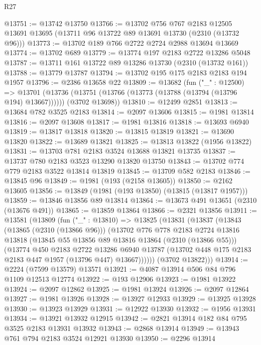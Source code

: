 \begin{lexlean}{R27}
\begin{coremodule}
@13751 := @13742 @13750
@13766 := @13702
    @756
    @767
    @2183
    @12505
    @13691
    @13695
    (@13711 @96 @13722 @89 @13691 @13730 (@2310 (@13732 @96)))
@13773 := @13702 @189 @766 @2722 @2724 @2988 @13694 @13669
@13774 := @13702 @689
@13779 := @13774 @197 @2183 @2722 @13286 @5048
@13787 := @13711 @161 @13722 @89 @13286 @13730 (@2310 (@13732 @161))
@13788 := @13779 @13787
@13794 := @13702 @195 @175 @2183 @2183 @194 @1957
@13796 := @2386 @13658 @22
@13809 := @13682
    (fun ("_" : @12500) =>
    @13701
      (@13736 (@13751 (@13766 (@13773 (@13788 (@13794 (@13796 @194) @13667))))))
      (@3702 @13698))
@13810 := @12499 @2851
@13813 := @13684 @782 @3525 @2183
@13814 := @2097 @13606
@13815 := @1981 @13814
@13816 := @2097 @13608
@13817 := @1981 @13816
@13818 := @13693 @6940
@13819 := @13817 @13818
@13820 := @13815 @13819
@13821 := @13690 @13820
@13822 := @13689 @13821
@13825 := @13813 @13822 (@1956 @13822)
@13831 := @13703 @781 @2183 @3524 @13688 @13821 @13735
@13837 := @13737 @780 @2183 @3523 @13290 @13820 @13750
@13843 := @13702 @774 @779 @2183 @3522 @13814 @13819
@13845 := @13709 @582 @2183
@13846 := @13845 @96
@13849 := @1981 (@193 (@2158 @13605))
@13850 := @2162 @13605
@13856 := @13849 (@1981 (@193 @13850) (@13815 (@13817 @1957)))
@13859 := @13846 @13856 @89 @13814
@13864 := @13673 @491 @13651 (@2310 (@13676 @491))
@13865 := @13859 @13864
@13866 := @2321 @13856
@13911 := @13581
    (@13809
      (fun ("_" : @13810) =>
      @13825
        (@13831
          (@13837
            (@13843
              (@13865 (@2310 (@13866 @96)))
              (@13702
                @776
                @778
                @2183
                @2724
                @13816
                @13818
                (@13845 @55 @13856 @89 @13816 @13864 (@2310 (@13866 @55)))
                (@13774
                  @450
                  @2183
                  @2722
                  @13286
                  @6940
                  @13787
                  (@13702 @448 @175 @2183 @2183 @447 @1957 (@13796 @447) @13667))))))
        (@3702 @13822)))
@13914 := @2224 (@7599 @13579) @13571
@13921 := @4087 @13914 @506 @84 @796 @1109 @12513 @12774
@13922 := @193 @12906
@13923 := @1981 @13922
@13924 := @2097 @12862
@13925 := @1981 @13924
@13926 := @2097 @12864
@13927 := @1981 @13926
@13928 := @13927 @12933
@13929 := @13925 @13928
@13930 := @13923 @13929
@13931 := @12922 @13930
@13932 := @1956 @13931
@13934 := @13921 @13932 @12915
@13942 := @2821 @13914 @182 @84 @795 @3525 @2183 @13931 @13932
@13943 := @2868 @13914
@13949 := @13943 @761 @794 @2183 @3524 @12921 @13930
@13950 := @2296 @13914

\end{coremodule}
\end{lexlean}
